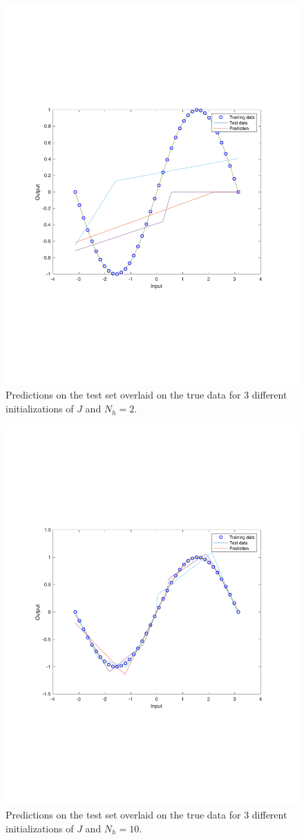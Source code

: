 \documentclass[]{article}
\begin{document}
\begin{figure}[H]
    \centering
    \includegraphics[width=0.6\linewidth]{problem2a2.pdf}
    \caption{Predictions on the test set overlaid on the true data for 3 different initializations of $J$ and $N_h=2$.}
    \label{fig:my_label}
\end{figure}

\begin{figure}[H]
    \centering
    \includegraphics[width=0.6\linewidth]{problem2a10.pdf}
    \caption{Predictions on the test set overlaid on the true data for 3 different initializations of $J$ and $N_h=10$.}
    \label{fig:my_label}
\end{figure}
\end{document}
